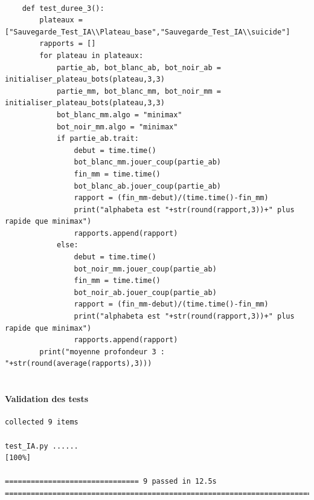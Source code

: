 \documentclass{article}
\begin{document}
\begin{verbatim}
       
    def test_duree_3():
        plateaux = ["Sauvegarde_Test_IA\\Plateau_base","Sauvegarde_Test_IA\\suicide"]
        rapports = []
        for plateau in plateaux:
            partie_ab, bot_blanc_ab, bot_noir_ab = initialiser_plateau_bots(plateau,3,3)
            partie_mm, bot_blanc_mm, bot_noir_mm = initialiser_plateau_bots(plateau,3,3)
            bot_blanc_mm.algo = "minimax"
            bot_noir_mm.algo = "minimax"
            if partie_ab.trait:
                debut = time.time()
                bot_blanc_mm.jouer_coup(partie_ab)
                fin_mm = time.time()
                bot_blanc_ab.jouer_coup(partie_ab)
                rapport = (fin_mm-debut)/(time.time()-fin_mm)
                print("alphabeta est "+str(round(rapport,3))+" plus rapide que minimax")
                rapports.append(rapport)
            else:
                debut = time.time()
                bot_noir_mm.jouer_coup(partie_ab)
                fin_mm = time.time()
                bot_noir_ab.jouer_coup(partie_ab)
                rapport = (fin_mm-debut)/(time.time()-fin_mm)
                print("alphabeta est "+str(round(rapport,3))+" plus rapide que minimax")
                rapports.append(rapport)
        print("moyenne profondeur 3 : "+str(round(average(rapports),3)))


\end{verbatim}
\paragraph{Validation des tests}
\begin{verbatim}
collected 9 items

test_IA.py ......                                                                                                                                                  [100%]

=============================== 9 passed in 12.5s ============================================================================= 
\end{verbatim}
\end{document}
